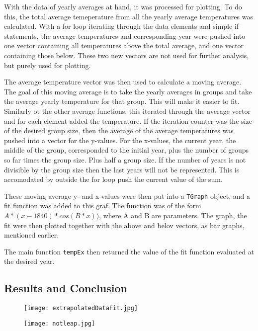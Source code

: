 With the data of yearly averages at hand, it was processed for plotting. To do this, the total average temeperature from all the yearly average temperatures was calculated. With a for loop iterating through the data elements and simple if statements, the average temperatures and corresponding year were pushed into one vector containing all temperatures above the total average, and one vector containing those below. These two new vectors are not used for further analysis, but purely used for plotting.

The average temperature vector was then used to calculate a moving average. The goal of this moving average is to take the yearly averages in groups and take the average yearly temperature for that group. This will make it easier to fit. Similarly ot the other average functions, this iterated through the average vector and for each element added the temperature. If the iteration counter was the size of the desired group size, then the average of the average temperatures was pushed into a vector for the y-values. For the x-values, the current year, the middle of the group, corresponded to the initial year, plus the number of groups so far times the group size. Plus half a group size. If the number of years is not divisible by the group size then the last years will not be represented. This is accomodated by outside the for loop push the current value of the sum.

These moving average y- and x-values were then put into a \texttt{TGraph} object, and a fit function was added to this graf. The function was of the form $A*(x-1840)*cos(B*x))$, where A and B are parameters. The graph, the fit were then plotted together with the above and belov vectors, as bar graphs, mentioned earlier.

The main function \texttt{tempEx} then returned the value of the fit function evaluated at the desired year.

\subsection{Results and Conclusion}

\begin{figure}[ht]
\begin{center}
\texttt{[image: extrapolatedDataFit.jpg]}
\caption{\label{fig:extrap1}}
\end{center}
\end{figure}

\begin{figure}[ht]
\begin{center}
\texttt{[image: notleap.jpg]}
\caption{\label{fig:extrap2}}
\end{center}
\end{figure}

